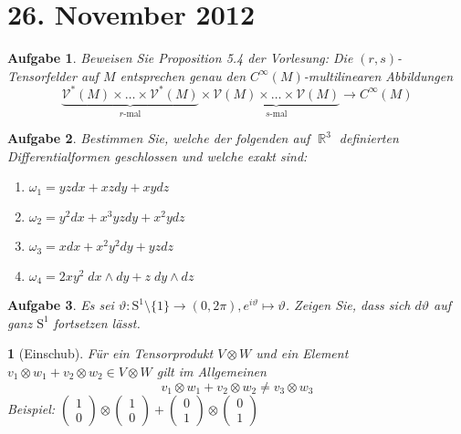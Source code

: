 \documentclass[paper=A4, twoside, chapterprefix=true, bibliography=totoc, headsepline]{scrbook}
\let\temp\phi{}
\let\phi\varphi{}
\let\varphi\temp{}
\let\temp\theta{}
\let\theta\vartheta{}
\let\vartheta\temp{}
\let\temp\epsilon{}
\let\epsilon\varepsilon{}
\let\varepsilon\temp{}
\let\temp\rho{}
\let\rho\varrho{}
\let\varrho\temp{}
\DeclareMathOperator{\R}{\mathbb{R}}
\theoremstyle{plain}
\theoremstyle{nonumberplain}
\theoremstyle{empty}
\newtheorem{emptythm}{}%
\theoremstyle{break}
\newtheorem{Aufg}{Aufgabe}
\begin{document}

\section{26. November 2012}
\setcounter{Aufg}{0} %
\setcounter{Loes}{0}

\begin{Aufg}
Beweisen Sie Proposition 5.4 der Vorlesung: Die $(r,s)$-Tensorfelder auf $M$ entsprechen genau den $C^\infty(M)$-multilinearen Abbildungen
	\[\underbrace{\mathcal{V^*}(M) \times \dots \times \mathcal{V^*}(M)}_\text{$r$-mal} \times \underbrace{\mathcal{V}(M)\times \dots \times \mathcal{V}(M)}_\text{$s$-mal} \to C^\infty(M)\]
\end{Aufg}

\begin{Aufg}
Bestimmen Sie, welche der folgenden auf $\R^3$ definierten Differentialformen geschlossen und  welche exakt sind:
\begin{enumerate}[label=\alph*),leftmargin=*,widest=b]
\item
	$\omega_1=y z dx + x z d y + x y dz$
\item
	$\omega_2=y^2 dx + x^3 y z d y + x^2 y dz$
\item
	$\omega_3=x dx + x^2 y^2 d y + y  z dz$
\item
	$\omega_4=2 xy^2 \;dx\wedge dy +  z \;d y\wedge dz$
\end{enumerate}\end{Aufg}

\begin{Aufg}
Es sei $\theta: \mathrm{S}^1\setminus \{1\} \to (0,2\pi), e^{i \theta} \mapsto \theta$. Zeigen Sie, dass sich $d\theta$ auf ganz $\mathrm{S}^1$ fortsetzen lässt.
\end{Aufg}

\begin{emptythm}[Einschub]
F\"ur ein Tensorprodukt $V \otimes W$ und ein Element $v_1 \otimes w_1 + v_2 \otimes w_2 \in V \otimes W$ gilt im Allgemeinen
	\[v_1 \otimes w_1 + v_2 \otimes w_2 \ne v_3 \otimes w_3 \]
\emph{Beispiel:} $\left( \begin{smallmatrix} 1 \\ 0 \end{smallmatrix} \right) \otimes \left( \begin{smallmatrix} 1 \\ 0 \end{smallmatrix} \right) + \left( \begin{smallmatrix} 0 \\ 1 \end{smallmatrix} \right) \otimes \left( \begin{smallmatrix} 0 \\ 1 \end{smallmatrix} \right)$
\end{emptythm}
\end{document}
